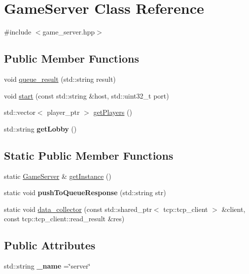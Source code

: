 \hypertarget{classGameServer}{}\section{Game\+Server Class Reference}
\label{classGameServer}


{\ttfamily \#include $<$game\+\_\+server.\+hpp$>$}

\subsection*{Public Member Functions}
\begin{DoxyCompactItemize}
\item 
void \hyperlink{classGameServer_a1059a53ce3bd5fe9fad31a16c6310104}{queue\+\_\+result} (std\+::string result)
\item 
void \hyperlink{classGameServer_a8c6534df2bb4196b7bdcd8c4f15ce8fc}{start} (const std\+::string \&host, std\+::uint32\+\_\+t port)
\item 
std\+::vector$<$ player\+\_\+ptr $>$ \hyperlink{classGameServer_a24b8a605a18de2c5a1e183e505cd7684}{get\+Players} ()
\item 
std\+::string {\bfseries get\+Lobby} ()\hypertarget{classGameServer_ac8dfcb08211ddfbf28c846c04892d0c4}{}\label{classGameServer_ac8dfcb08211ddfbf28c846c04892d0c4}

\end{DoxyCompactItemize}
\subsection*{Static Public Member Functions}
\begin{DoxyCompactItemize}
\item 
static \hyperlink{classGameServer}{Game\+Server} \& \hyperlink{classGameServer_a588419f7d78b27f71b4bb2446c67b7b8}{get\+Instance} ()
\item 
static void {\bfseries push\+To\+Queue\+Response} (std\+::string str)\hypertarget{classGameServer_ac19c80082a7c4c27db9615bbb9d7ecd0}{}\label{classGameServer_ac19c80082a7c4c27db9615bbb9d7ecd0}

\item 
static void \hyperlink{classGameServer_ac54878b70dc19acf32ff914708b409f1}{data\+\_\+collector} (const std\+::shared\+\_\+ptr$<$ tcp\+::tcp\+\_\+client $>$ \&client, const tcp\+::tcp\+\_\+client\+::read\+\_\+result \&res)
\end{DoxyCompactItemize}
\subsection*{Public Attributes}
\begin{DoxyCompactItemize}
\item 
std\+::string {\bfseries \+\_\+name} =\char`\"{}server\char`\"{}\hypertarget{classGameServer_a48c6dc5a829d372970dbe98b0dc99d16}{}\label{classGameServer_a48c6dc5a829d372970dbe98b0dc99d16}

\end{DoxyCompactItemize}
